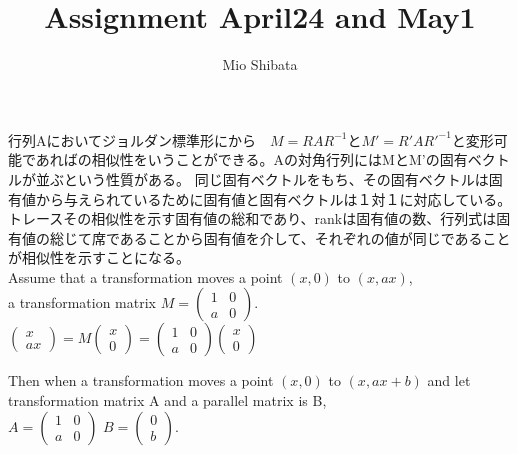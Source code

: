 \documentclass[11pt, oneside]{jsarticle} 	%
\title{Assignment April24 and May1}
\author{Mio Shibata}
\date{}							%
\begin{document}
\maketitle

行列Aにおいてジョルダン標準形にから　$M = R AR^{-1}$と$M′=R′AR′^{−1}$と変形可能であればの相似性をいうことができる。Aの対角行列にはMとM’の固有ベクトルが並ぶという性質がある。
同じ固有ベクトルをもち、その固有ベクトルは固有値から与えられているために固有値と固有ベクトルは１対１に対応している。
トレースその相似性を示す固有値の総和であり、rankは固有値の数、行列式は固有値の総じて席であることから固有値を介して、それぞれの値が同じであることが相似性を示すことになる。\\

Assume that a transformation moves a point $(x,0)$ to $(x,ax)$,\\
a transformation matrix 
$ M=
\begin{pmatrix}
 1 & 0\\
 a & 0
\end{pmatrix}.$\\
$\begin{pmatrix}
 x\\
 ax
\end{pmatrix}=M\begin{pmatrix}
 x\\
 0
\end{pmatrix}=\begin{pmatrix}
 1 & 0\\
 a & 0
\end{pmatrix}\begin{pmatrix}
 x\\
 0
\end{pmatrix}$


Then when a transformation moves a point $(x,0)$ to $(x,ax+b)$ and let transformation matrix A and a parallel matrix is B, \\
$ A=
\begin{pmatrix}
 1 & 0\\
 a & 0
\end{pmatrix}$ 
$ B=
\begin{pmatrix}
 0\\
 b
\end{pmatrix}.$
\end{document}
